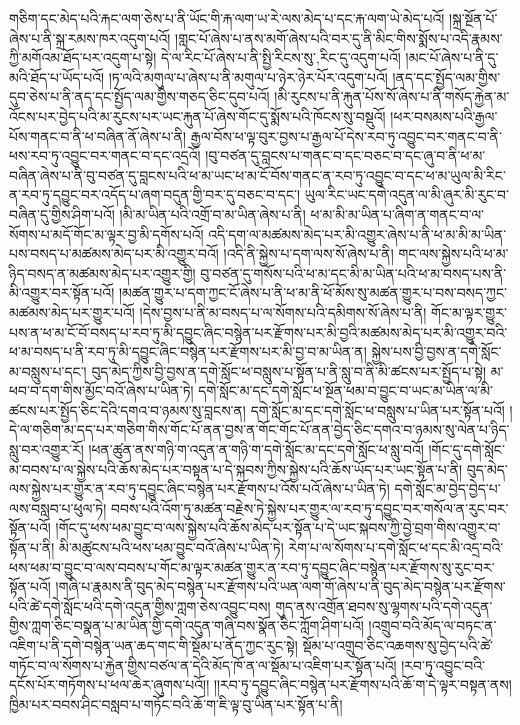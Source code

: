 གཅིག་དང་མེད་པའི་རྐང་ལག་ཅེས་པ་ནི་ཡོང་གི་རྐ་ལག་ཡ་རེ་ལས་མེད་པ་དང་རྐ་ལག་ཡེ་མེད་པའོ། །སྐྲ་སྔོན་པོ་ཞེས་པ་ནི་སྐྲ་རམས་ཁར་འདུག་པའོ། །གླང་པོ་ཞེས་པ་ནས་མགོ་ཞེས་པའི་བར་དུ་ནི་མིང་གིས་སྨོས་པ་འདི་རྣམས་ཀྱི་མགོའམ་ཐོད་པར་འདུག་པ་སྟེ། དེ་ལ་རིང་པོ་ཞེས་པ་ནི་སྤྱི་{རིངས་སུ་,རིང་དུ་}འདུག་པའོ། །མང་པོ་ཞེས་པ་ནི་དུ་མའི་ཐོད་པ་ཡོད་པའོ། །ཏ་ལའི་མགུལ་པ་ཞེས་པ་ནི་མགུལ་པ་ཉེར་ཉེར་པོར་འདུག་པའོ། །ནད་དང་སྤྱོད་ལམ་གྱིས་དུབ་ཅེས་པ་ནི་ནད་དང་སྤྱོད་ལམ་གྱིས་གཅད་ཅིང་དུབ་པའོ། །མི་རུངས་པ་ནི་རྐུན་པོས་སོ་ཞེས་པ་ནི་གསོད་རྐྱེན་མ་འོངས་པར་བྱེད་པའི་མ་རུངས་པར་ཡང་རྐུན་པོ་ཞེས་གོང་དུ་སྨོས་པའི་ཁོངས་སུ་བསྡུའོ། །ཕར་བསམས་པའི་རྒྱལ་པོས་གནང་བ་ནི་ཕ་བཞིན་ནོ་ཞེས་པ་ནི། རྒྱལ་བོས་ཕ་ལྟ་བུར་བྱས་པ་རྒྱལ་པོ་དེས་རབ་ཏུ་འབྱུང་བར་གནང་བ་ནི་ཕས་རབ་ཏུ་འབྱུང་བར་གནང་བ་དང་འདྲའོ། །བུ་བཙན་དུ་བླངས་པ་གནང་བ་དང་བཅང་བ་དང་ཞུ་བ་ནི་ཕ་མ་བཞིན་ཞེས་པ་ནི་བུ་བཙན་དུ་བླངས་པའི་ཕ་མ་ཡང་ཕ་མ་ངོ་བོས་གནང་ན་རབ་ཏུ་འབྱུང་བ་དང་ཕ་མ་ཡུལ་མི་རིང་ན་རབ་ཏུ་དབྱུང་བར་འདོད་པ་ཞག་བདུན་གྱི་བར་དུ་བཅང་བ་དང་། ཡུལ་རིང་ཡང་དགེ་འདུན་ལ་མི་ཞུར་མི་རུང་བ་བཞིན་དུ་གྱིས་ཤིག་པའོ། །མི་མ་ཡིན་པའི་འགྲོ་བ་མ་ཡིན་ཞེས་པ་ནི། ཕ་མ་མི་མ་ཡིན་པ་ཞིག་ན་གནང་བ་ལ་སོགས་པ་མདོ་གོང་མ་ལྟར་བྱ་མི་དགོས་པའོ། འདི་དག་ལ་མཚམས་མེད་པར་མི་འགྱུར་ཞེས་པ་ནི་ཕ་མ་མི་མ་ཡིན་པས་བསད་པ་མཚམས་མེད་པར་མི་འགྱུར་བའོ། །འདི་ནི་སྐྱེས་པ་དག་ལས་སོ་ཞེས་པ་ནི། གང་ལས་སྐྱེས་པའི་ཕ་མ་ཉིད་བསད་ན་མཚམས་མེད་པར་འགྱུར་གྱི། བུ་བཙན་དུ་གསོས་པའི་ཕ་མ་དང་མི་མ་ཡིན་པའི་ཕ་མ་བསད་པས་ནི་མི་འགྱུར་བར་སྟོན་པའོ། །མཚན་གྱུར་པ་དག་ཀྱང་ངོ་ཞེས་པ་ནི་ཕ་མ་ནི་ཕོ་མོས་སུ་མཚན་གྱུར་པ་བས་བསད་ཀྱང་མཚམས་མེད་པར་གྱུར་པའོ། །དེས་བྱས་པ་ནི་མ་བསད་པ་ལ་སོགས་པའི་དམིགས་སོ་ཞེས་པ་ནི། གོང་མ་ལྟར་གྱུར་པས་ན་ཕ་མ་ངོ་བོ་བསད་པ་རབ་ཏུ་མི་དབྱུང་ཞིང་བསྙེན་པར་རྫོགས་པར་མི་བྱའི་མཚམས་མེད་པར་མི་འགྱུར་བའི་ཕ་མ་བསད་པ་ནི་རབ་ཏུ་མི་དབྱུང་ཞིང་བསྙེན་པར་རྫོགས་པར་མི་བྱ་བ་མ་ཡིན་ན། སྐྱེས་པས་བྱི་བྱས་ན་དགེ་སློང་མ་བསླུས་པ་དང་། བུད་མེད་ཀྱིས་བྱི་བྱས་ན་དགེ་སློང་ཕ་བསླུས་པ་སྟོན་པ་ནི་སླུ་བ་ནི་མི་ཚངས་པར་སྤྱོད་པ་སྟེ། མ་ཕབ་བ་དག་གིས་མྱོང་བའོ་ཞེས་པ་ཡིན་ཏེ། དགེ་སློང་མ་དང་དགེ་སློང་ཕ་སྔོན་ཕམ་བ་བྱུང་བ་ཡང་མ་ཡིན་ལ་མི་ཚངས་པར་སྤྱོད་ཅིང་དེའི་དགའ་བ་ཉམས་སུ་བླངས་ན། དགེ་སློང་མ་དང་དགེ་སློང་ཕ་བསླུས་པ་ཡིན་པར་སྟོན་པའོ། །དེ་ལ་གཅིག་མ་དད་པར་གཅིག་གིས་གོང་པོ་ནན་བྱས་ན་གོང་གོང་པོ་ནན་བྱེད་ཅིང་དགའ་བ་ཉམས་སུ་ལེན་པ་ཉིད་སླུ་བར་འགྱུར་རོ། །ཕན་ཚུན་ནས་གཉི་ག་འདུན་ན་གཉི་ག་དགེ་སློང་མ་དང་དགེ་སློང་ཕ་སླུ་བའོ། །གོང་དུ་དགེ་སློང་མ་བབས་པ་ལ་སྐྱེས་པའི་ཆོས་མེད་པར་བསྟན་པ་དེ་སྐབས་ཀྱིས་སྐྱེས་པའི་ཆོས་ཡོད་པར་ཡང་སྟོན་པ་ནི། བུད་མེད་ལས་སྐྱེས་པར་གྱུར་ན་རབ་ཏུ་དབྱུང་ཞིང་བསྙེན་པར་རྫོགས་པ་འོས་པའོ་ཞེས་པ་ཡིན་ཏེ། དགེ་སློང་མ་བྱེད་བྱེད་པ་ལས་བསླབ་པ་ཕུལ་ཏེ། བབས་པའི་འོག་ཏུ་མཚན་བརྗེས་ཏེ་སྐྱེས་པར་གྱུར་ལ་རབ་ཏུ་དབྱུང་བར་གསོལ་ན་རུང་བར་སྟོན་པའོ། །གོང་དུ་ཕས་ཕམ་བྱུང་བ་ལས་སྐྱེས་པའི་ཆོས་མེད་པར་སྟོན་པ་དེ་ཡང་སྐབས་ཀྱི་བྱེ་བྲག་གིས་འགྱུར་བ་སྟོན་པ་ནི། མི་མཚུངས་པའི་ཕས་ཕམ་བྱུང་བའོ་ཞེས་པ་ཡིན་ཏེ། རེག་པ་ལ་སོགས་པ་དགེ་སློང་ཕ་དང་མི་འདྲ་བའི་ཕས་ཕམ་བ་བྱུང་བ་ལས་བབས་པ་གོང་མ་ལྟར་མཚན་གྱུར་ན་རབ་ཏུ་དབྱུང་ཞིང་བསྙེན་པར་རྫོགས་སུ་རུང་བར་སྟོན་པའོ། །གཞི་པ་རྣམས་ནི་བུད་མེད་བསྙེན་པར་རྫོགས་པའི་ཡན་ལག་གོ་ཞེས་པ་ནི་བུད་མེད་བསྙེན་པར་རྫོགས་པའི་ཚེ་དགེ་སློང་ཕའི་དགེ་འདུན་གྱིས་ཀླག་ཅེས་འབྱུང་བས། གུད་ནས་འགྲོན་ཐབས་སུ་ལྷགས་པའི་དགེ་འདུན་གྱིས་ཀླག་ཅིང་བསྣན་པ་མ་ཡིན་གྱི་དགེ་འདུན་གཞི་བས་སྣོན་ཅིང་ཀློག་ཤིག་པའོ། །འགྲུབ་བའི་མོད་ལ་བཏང་ན་འཇིག་པ་ནི་དགེ་བསྙེན་ཡན་ཆད་གང་གི་སྡོམ་པ་ནོད་ཀྱང་རུང་སྟེ། སྡོམ་པ་འགྲུབ་ཅིང་འཆགས་སུ་བྱེད་པའི་ཚེ་གཏོང་བ་ལ་སོགས་པ་རྐྱེན་གྱིས་བཙལ་ན་དེའི་མོད་ཁོ་ན་ལ་སྡོམ་པ་འཇིག་པར་སྟོན་པའོ། །རབ་ཏུ་འབྱུང་བའི་དངོས་པོར་གཏོགས་པ་ཕལ་ཆེར་ཞུགས་པའོ།། །།རབ་ཏུ་དབྱུང་ཞིང་བསྙེན་པར་རྫོགས་པའི་ཆོ་ག་དེ་ལྟར་བསྟན་ནས། ཁྱིམ་པར་བབས་ཤིང་བསླབ་པ་གཏོང་བའི་ཆོ་ག་ཇི་ལྟ་བུ་ཡིན་པར་སྟོན་པ་ནི། 